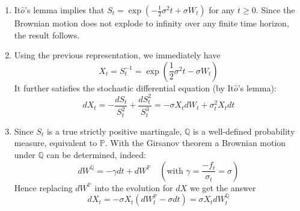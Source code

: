 \documentclass[12pt,a4paper]{exam}
\begin{document}
\begin{questions}

\begin{solution}
\begin{enumerate}[label=(\alph*),font=\itshape]
\item It$\hat{o}$'s lemma implies that $S_t = \exp (-\frac{1}{2}\sigma^2 t + \sigma W_t)$ for any $t \geq 0$. Since the Brownian motion does not
explode to infinity over any finite time horizon, the result follows.
\item Using the previous representation, we immediately have
\begin{equation*}
X_t = S_t^{-1} = \exp\left(\frac{1}{2}\sigma^2 t - \sigma W_t\right)
\end{equation*}
It further satisfies the stochastic differential equation (by It$\hat{o}$’s lemma):
\begin{equation*}
dX_t = -\frac{dS_t}{S_t^2} + \frac{dS^2_t}{S_t^3} = -\sigma X_t dW_t + \sigma^2_t X_t dt
\end{equation*}
\item Since $S_t$ is a true strictly positive martingale, $\mathbb{Q}$ is a well-defined probability measure, equivalent to $\mathbb{P}$.
With the Girsanov theorem a Brownian motion under $\mathbb{Q}$ can be determined, indeed:
\begin{equation*}
dW^{\mathbb{Q}} = -\gamma dt + dW^{\mathbb{P}}\quad\left(\text{with }\gamma = \frac{-f_t}{\sigma_t}=\sigma \right)
\end{equation*}
Hence replacing $dW^{\mathbb{P}}$ into the evolution for $dX$ we get the answer
\begin{equation*}
dX_t = -\sigma X_t(dW^{\mathbb{P}}_t - \sigma dt) = \sigma X_t dW_t^{\mathbb{Q}}  
\end{equation*}

\end{enumerate}
\end{solution}
\end{questions}
\end{document}
